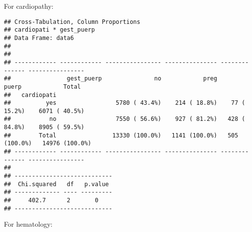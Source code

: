 \documentclass[
]{article}
\newenvironment{Shaded}{\begin{snugshade}}{\end{snugshade}}
\newcommand{\DataTypeTok}[1]{\textcolor[rgb]{0.13,0.29,0.53}{#1}}
\newcommand{\KeywordTok}[1]{\textcolor[rgb]{0.13,0.29,0.53}{\textbf{#1}}}
\newcommand{\NormalTok}[1]{#1}
\newcommand{\OperatorTok}[1]{\textcolor[rgb]{0.81,0.36,0.00}{\textbf{#1}}}
\newcommand{\OtherTok}[1]{\textcolor[rgb]{0.56,0.35,0.01}{#1}}
\newcommand{\StringTok}[1]{\textcolor[rgb]{0.31,0.60,0.02}{#1}}
\begin{document}
For cardiopathy:

\begin{Shaded}
\end{Shaded}

\begin{verbatim}
## Cross-Tabulation, Column Proportions  
## cardiopati * gest_puerp  
## Data Frame: data6  
## 
## 
## ------------ ------------ ---------------- --------------- -------------- ----------------
##                gest_puerp               no            preg          puerp            Total
##   cardiopati                                                                              
##          yes                 5780 ( 43.4%)    214 ( 18.8%)    77 ( 15.2%)    6071 ( 40.5%)
##           no                 7550 ( 56.6%)    927 ( 81.2%)   428 ( 84.8%)    8905 ( 59.5%)
##        Total                13330 (100.0%)   1141 (100.0%)   505 (100.0%)   14976 (100.0%)
## ------------ ------------ ---------------- --------------- -------------- ----------------
## 
## ----------------------------
##  Chi.squared   df   p.value 
## ------------- ---- ---------
##     402.7      2       0    
## ----------------------------
\end{verbatim}

For hematology:

\begin{Shaded}
\end{Shaded}
\end{document}

